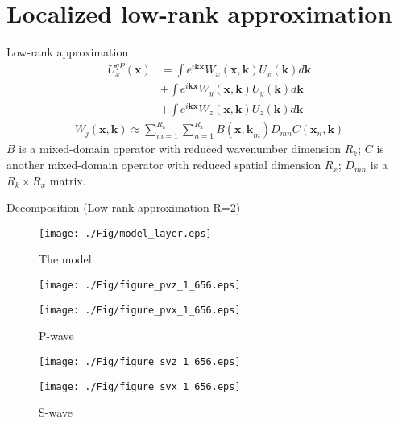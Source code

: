 \documentclass[aspectratio=169]{beamer}
\begin{document}
\section{Localized low-rank approximation}
\begin{frame}{Low-rank approximation}
\begin{eqnarray*}
U^{qP}_x(\mathbf{x})&=\int e^{i\mathbf{kx}}W_x(\mathbf{x,k})U_x(\mathbf{k})d\mathbf{k}\\
                    &+\int e^{i\mathbf{kx}}W_y(\mathbf{x,k})U_y(\mathbf{k})d\mathbf{k}\\
                    &+\int e^{i\mathbf{kx}}W_z(\mathbf{x,k})U_z(\mathbf{k})d\mathbf{k}
\end{eqnarray*}
\begin{eqnarray*}
W_j(\mathbf{x,k})\approx \sum^{R_k}_{m=1}\sum^{R_x}_{n=1}B(\mathbf{x,k}_{m})D_{m n}C(\mathbf{x}_{n},\mathbf{k})
\end{eqnarray*}
$B$ is a mixed-domain operator with reduced wavenumber dimension $R_k$; $C$ is another mixed-domain operator with reduced spatial dimension $R_x$; $D_{m n}$ is a $R_k \times R_x$ matrix. 
\end{frame}
\begin{frame}{Decomposition (Low-rank approximation R=2)}
\center
   \begin{figure}[h]
        \begin{minipage}[h]{0.20\linewidth}
            \centering
            \texttt{[image: ./Fig/model\_layer.eps]}
            \caption{The model}
        \end{minipage}
        \hspace{0.5cm}
        \begin{minipage}[h]{0.25\linewidth}
            \centering
            \texttt{[image: ./Fig/figure\_pvz\_1\_656.eps]}

            \texttt{[image: ./Fig/figure\_pvx\_1\_656.eps]}
            \caption{P-wave}
        \end{minipage}
        \hspace{0.5cm}
        \begin{minipage}[h]{0.25\linewidth}
            \centering
            \texttt{[image: ./Fig/figure\_svz\_1\_656.eps]}

            \texttt{[image: ./Fig/figure\_svx\_1\_656.eps]}
            \caption{S-wave}
        \end{minipage}
    \end{figure}

\end{frame}
\end{document}
